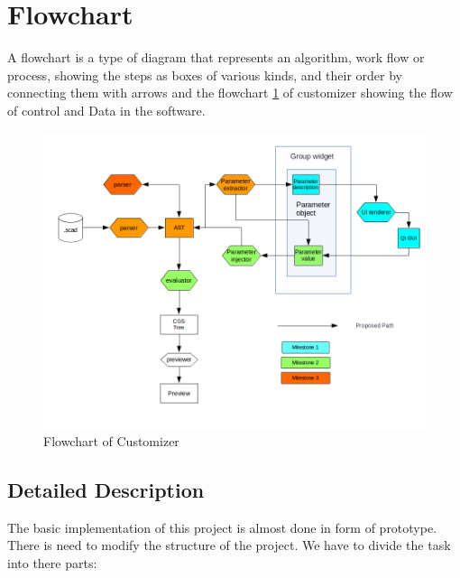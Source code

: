 \section{Flowchart}
A flowchart is a type of diagram that represents an algorithm, work flow or process, showing the steps as boxes of various kinds, and their order by connecting them with arrows
and the flowchart \ref{fig:FD1} of customizer showing the flow of control and Data in the software.

\begin{figure}
	\centering \includegraphics[width=\linewidth]{images/flowchart.png}
	\caption{Flowchart of Customizer}
	\label{fig:FD1}
\end{figure}

\subsection{Detailed Description}

The basic implementation of this project is almost done in form of prototype. There is need to modify the structure of the project. We have to divide the task into there parts:

